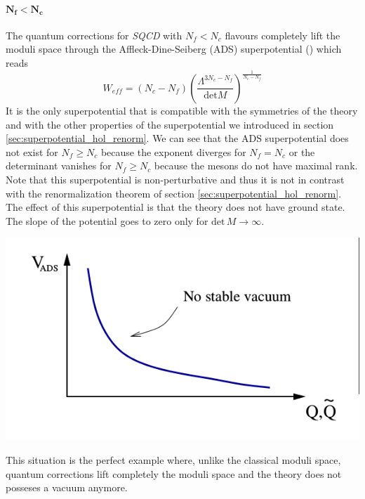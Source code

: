 \paragraph{$\mathbf{ N_f < N_c}$}
The quantum corrections for \emph{SQCD} with $N_f < N_c$ flavours completely lift the moduli space through the Affleck-Dine-Seiberg (ADS) superpotential (\cite{Davis:1983mz}\cite{Affleck:1983mk}) which reads
\begin{equation}
W_{eff} = \left( N_c - N_f  \right)\left( 
\frac{\Lambda^{3N_c -  N_f }}
{\mathrm{det} {M}}
\right)^{ \frac{1}{N_c - N_f}}
\end{equation}
It is the only superpotential that is compatible with the symmetries of the theory and with the other properties of the superpotential we introduced in section \ref{sec:superpotential_hol_renorm}.
We can see that the ADS superpotential does not exist for $N_f \geq N_c$ because the exponent diverges for $N_f = N_c$ or the determinant vanishes for $N_f \ge N_c$ because the mesons do not have maximal rank.
Note that this superpotential is non-perturbative and thus it is not in contrast with the renormalization theorem of section \ref{sec:superpotential_hol_renorm}.
The effect of this superpotential is that the theory does not have ground state.
The slope of the potential goes to zero only for $\mathrm{det} \, {M}  \rightarrow \infty $.
\begin{center}
\includegraphics[scale=0.5]{ads_super.png}
\end{center}
This situation is the perfect example where, unlike the classical moduli space, quantum corrections lift completely the moduli space and the theory does not posseses a vacuum anymore.

